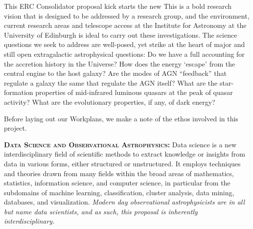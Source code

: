\smallskip
\smallskip
\noindent
This ERC Consolidator proposal kick starts the new 
This is a bold research vision that is designed to be addressed by a
research group, and the environment, current research areas and
telescope access at the Institute for Astronomy at the University of Edinburgh 
is ideal to carry out these investigations.
The science questions we seek to address are well-posed, yet strike at
the heart of major and still open extragalactic astrophysical
questions: Do we have a full accounting for the accretion history in
the Universe?  How does the energy `escape' from the central engine to
the host galaxy?  Are the modes of AGN ``feedback'' that regulate a
galaxy the same that regulate the AGN itself?  What are the
star-formation properties of mid-infrared luminous quasars at the peak
of quasar activity?  What are the evolutionary properties, if any, of
dark energy?


\smallskip
\smallskip
\noindent
Before laying out our Workplans, we make a note of the ethos involved in this project. 


\smallskip
\smallskip
\noindent
\textbf{\textsc{{Data Science and Observational Astrophysics: }}}
Data science is a new interdisciplinary field of scientific methods to extract knowledge or insights from data in various forms, either structured or unstructured. It employs techniques and theories drawn from many fields within the broad areas of mathematics, statistics, information science, and computer science, in particular from the subdomains of machine learning, classification, cluster analysis, data mining, databases, and visualization.  {\it Modern day observational astrophysicists are in all but name data scientists, and as such, this proposal is inherently interdisciplinary.}

